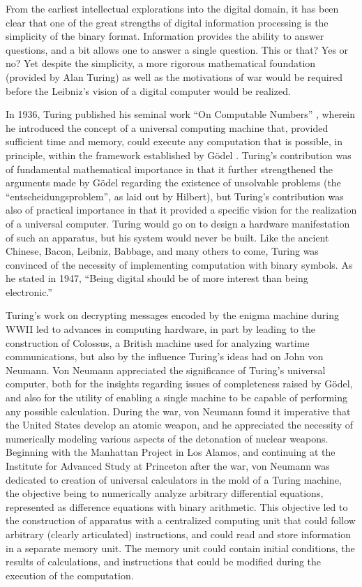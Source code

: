 \documentclass[twocolumn]{article}
\begin{document}
From the earliest intellectual explorations into the digital domain, it has been clear that one of the great strengths of digital information processing is the simplicity of the binary format. Information provides the ability to answer questions, and a bit allows one to answer a single question. This or that? Yes or no? Yet despite the simplicity, a more rigorous mathematical foundation (provided by Alan Turing) as well as the motivations of war would be required before the Leibniz's vision of a digital computer would be realized.

In 1936, Turing published his seminal work ``On Computable Numbers'' \cite{tu1936}, wherein he introduced the concept of a universal computing machine that, provided sufficient time and memory, could execute any computation that is possible, in principle, within the framework established by G\"{o}del \cite{}. Turing's contribution was of fundamental mathematical importance in that it further strengthened the arguments made by G\"{o}del regarding the existence of unsolvable problems (the ``entscheidungsproblem'', as laid out by Hilbert), but Turing's contribution was also of practical importance in that it provided a specific vision for the realization of a universal computer. Turing would go on to design a hardware manifestation of such an apparatus, but his system would never be built. Like the ancient Chinese, Bacon, Leibniz, Babbage, and many others to come, Turing was convinced of the necessity of implementing computation with binary symbols. As he stated in 1947, ``Being digital should be of more interest than being electronic.'' \cite{tu1947} 

Turing's work on decrypting messages encoded by the enigma machine during WWII led to advances in computing hardware, in part by leading to the construction of Colossus, a British machine used for analyzing wartime communications, but also by the influence Turing's ideas had on John von Neumann. Von Neumann appreciated the significance of Turing's universal computer, both for the insights regarding issues of completeness raised by G\"{o}del, and also for the utility of enabling a single machine to be capable of performing any possible calculation. During the war, von Neumann found it imperative that the United States develop an atomic weapon, and he appreciated the necessity of numerically modeling various aspects of the detonation of nuclear weapons. Beginning with the Manhattan Project in Los Alamos, and continuing at the Institute for Advanced Study at Princeton after the war, von Neumann was dedicated to creation of universal calculators in the mold of a Turing machine, the objective being to numerically analyze arbitrary differential equations, represented as difference equations with binary arithmetic. This objective led to the construction of apparatus with a centralized computing unit that could follow arbitrary (clearly articulated) instructions, and could read and store information in a separate memory unit. The memory unit could contain initial conditions, the results of calculations, and instructions that could be modified during the execution of the computation. 
\end{document}
